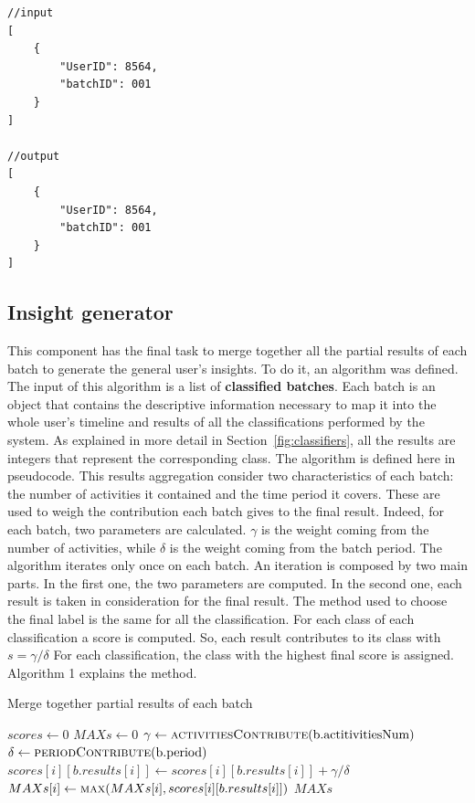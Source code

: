 \clearpage
\begin{multicols}{2}
\begin{verbatim}
//input
[
    {
        "UserID": 8564,
        "batchID": 001
    }
]
            
//output
[
    {
        "UserID": 8564,
        "batchID": 001
    }
]
\end{verbatim}
\end{multicols}

\subsection{Insight generator}
\label{sec:Generator}
This component has the final task to merge together all the partial results of each batch to generate the general user's insights.
To do it, an algorithm was defined. The input of this algorithm is a list of \textbf{classified batches}.
Each batch is an object that contains the descriptive information necessary to map it into the whole user's timeline and results of all the classifications performed by the system.
As explained in more detail in Section~\ref{fig:classifiers}, all the results are integers that represent the corresponding class.
The algorithm is defined here in pseudocode. This results aggregation consider two characteristics of each batch: the number of activities it contained and the time period it covers.
These are used to weigh the contribution each batch gives to the final result. Indeed, for each batch, two parameters are calculated.
$\gamma$ is the weight coming from the number of activities, while $\delta$ is the weight coming from the batch period.
The algorithm iterates only once on each batch. An iteration is composed by two main parts. In the first one, the two parameters are computed. In the second one, each result is taken in consideration for the final result.
The method used to choose the final label is the same for all the classification. For each class of each classification a score is computed. So, each result contributes to its class with $s = \gamma / \delta$
For each classification, the class with the highest final score is assigned. Algorithm 1 explains the method.

\begin{algorithm}
\caption{Merge together partial results of each batch}
\label{algoGenerator}
\begin{algorithmic}[1]
\State $scores \gets 0$
\State $MAXs \gets 0$
    \State $\gamma \gets \Call{activitiesContribute}{\text{b.actitivitiesNum}}$
    \State $\delta \gets \Call{periodContribute}{\text{b.period}}$
        \State $scores[i][b.results[i]] \gets scores[i][b.results[i]] + \gamma/\delta$
        \State $MAXs[i] \gets \Call{max}{MAXs[i], scores[i][b.results[i]]}$
    \EndFor
\EndFor
\Return $MAXs$
\EndFunction
\end{algorithmic}
\end{algorithm}

